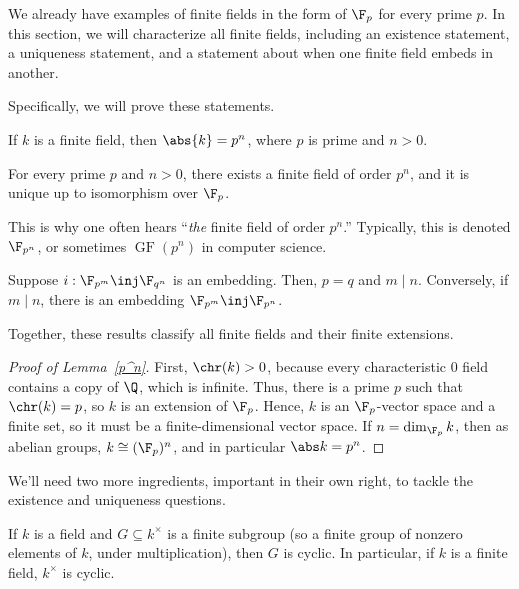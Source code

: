 We already have examples of finite fields in the form of $\F_p$ for every prime $p$. In this section, we will
characterize all finite fields, including an existence statement, a uniqueness statement, and a statement about
when one finite field embeds in another.

Specifically, we will prove these statements.
\begin{lem}
\label{p^n}
If $k$ is a finite field, then $\abs{k} = p^n$, where $p$ is prime and $n > 0$.
\end{lem}
\begin{thm}
\label{ff_ex_un}
For every prime $p$ and $n > 0$, there exists a finite field of order $p^n$, and it is unique up to isomorphism over
$\F_p$.
\end{thm}
This is why one often hears ``\emph{the} finite field of order $p^n$.'' Typically, this is denoted $\F_{p^n}$, or
sometimes $\operatorname{GF}(p^n)$ in computer science.
\begin{thm}
\label{ff_ext}
Suppose $i:\F_{p^m}\inj\F_{q^n}$ is an embedding. Then, $p = q$ and $m\mid n$. Conversely, if $m\mid n$, there is
an embedding $\F_{p^m}\inj\F_{p^n}$.
\end{thm}
Together, these results classify all finite fields and their finite extensions.
\begin{proof}[Proof of Lemma~\ref{p^n}]
First, $\chr(k) > 0$, because every characteristic $0$ field contains a copy of $\Q$, which is infinite. Thus,
there is a prime $p$ such that $\chr(k) = p$, so $k$ is an extension of $\F_p$. Hence, $k$ is an $\F_p$-vector
space and a finite set, so it must be a finite-dimensional vector space. If $n = \dim_{\F_p} k$, then as abelian
groups, $k\cong(\F_p)^n$, and in particular $\abs k = p^n$.
\end{proof}
We'll need two more ingredients, important in their own right, to tackle the existence and uniqueness questions.
\begin{prop}
If $k$ is a field and $G\subseteq k^\times$ is a finite subgroup (so a finite group of nonzero elements
of $k$, under multiplication), then $G$ is cyclic. In particular, if $k$ is a finite field, $k^\times$ is cyclic.
\end{prop}
